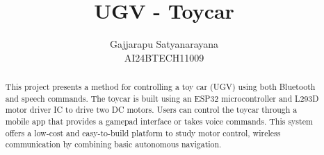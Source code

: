 \documentclass[conference]{IEEEtran}
\begin{document}

\title{ 
	\textbf{UGV - Toycar}
}
\author{Gajjarapu Satyanarayana \\ AI24BTECH11009}

\maketitle

\tableofcontents

\renewcommand{\thefigure}{\theenumi}
\renewcommand{\thetable}{\theenumi}

\bigskip

\begin{abstract}
This project presents a method for controlling a toy car (UGV) using both Bluetooth and speech commands. The toycar is built using an ESP32 microcontroller and L293D motor driver IC to drive two DC motors. Users can control the toycar through a mobile app that provides a gamepad interface or takes voice commands. This system offers a low-cost and easy-to-build platform to study motor control, wireless communication by combining basic autonomous navigation.
\end{abstract}
\end{document}
